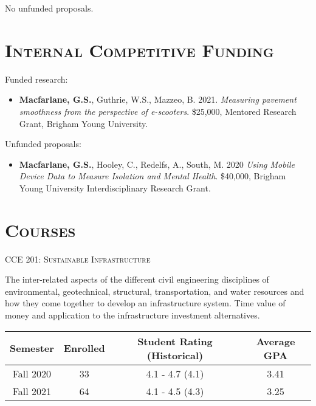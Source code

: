\documentclass[margin,line]{res}
\newif\ifdetail
\newcommand{\secfont}{\scshape }
\newcommand{\acc}{\scshape }
\begin{document}
\begin{resume}
No unfunded proposals.

\section{\secfont{Internal Competitive Funding}}
Funded research:
\begin{itemize}
  \item {\textbf{Macfarlane, G.S.}, Guthrie, W.S., Mazzeo, B. 2021. \textit{ Measuring pavement smoothness from the perspective of e-scooters}. \$25,000, Mentored Research Grant, Brigham Young University.}
\end{itemize}

Unfunded proposals:
\begin{itemize}
  \item{\textbf{Macfarlane, G.S.}, Hooley, C., Redelfs, A., South, M. 2020 \textit{ Using Mobile Device Data to Measure Isolation and Mental Health}}.
  \$40,000, Brigham Young University Interdisciplinary Research Grant.
\end{itemize}

\noindent\makebox[\linewidth]{\rule{\linewidth}{0.4pt}}
\section{\secfont Courses}

{\acc CCE 201: Sustainable Infrastructure}

\vspace{-.4cm}
The inter-related aspects of the different civil engineering disciplines of
environmental, geotechnical, structural, transportation, and water resources and
how they come together to develop an infrastructure system. Time value of money
and application to the infrastructure investment alternatives.


\ifdetail
\begin{tabular}{cccc}
  \toprule
  Semester & Enrolled & Student Rating (Historical) & Average GPA\\
  \midrule
  Fall 2020 & 33 & 4.1 - 4.7 (4.1)& 3.41 \\
  Fall 2021 & 64 & 4.1 - 4.5 (4.3)& 3.25 \\
  \bottomrule
\end{tabular}


\end{resume}
\end{document}
